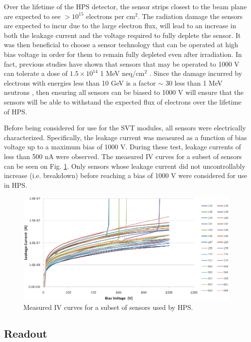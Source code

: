 Over the lifetime of the HPS detector, the sensor strips closest to the beam 
plane are expected to see $>10^{15}$ electrons per cm$^2$.  The radiation
damage the sensors are expected to incur due to the large electron flux,
will lead to an increase in both the leakage current and the voltage required to 
fully deplete the sensor.  It was then beneficial to choose a sensor technology
that can be operated at high bias voltage in order for them to remain fully
depleted even after irradiation. In fact, previous studies have shown that 
sensors that may be operated to 1000 V can tolerate a dose of 
$1.5 \times 10^{14}$ 1 MeV neq/cm$^2$ \cite{Fretwurst:2002vb}.  Since the damage
incurred by electrons with energies less than 10 GeV is a factor $\sim$ 30 less
than 1 MeV neutrons \cite{Rashevskaya:2002nd},
then ensuring all sensors can be biased to 1000 V will ensure that the sensors
will be able to withstand the expected flux of electrons over the lifetime of
HPS. 


Before being considered for use for the SVT modules, all sensors were electrically 
characterized.  Specifically, the leakage current was measured as a function
of bias voltage up to a maximum bias of 1000 V.  During these test, leakage 
currents of less than 500 nA were observed.  The measured IV curves for a subset
of sensors can be seen on Fig. \ref{fig:sensor_iv_curves}.  Only sensors whose
leakage current did not uncontrollably increase (i.e. breakdown) before reaching
a bias of 1000 V  were considered for use in HPS.
\begin{figure}[t!]
    \centering
    \includegraphics[width=\textwidth]{images/sensor_iv_curves.png}
    \caption{Measured IV curves for a subset of sensors used by HPS.}
    \label{fig:sensor_iv_curves}
\end{figure}

\subsection{Readout} \label{subsec:readout}

